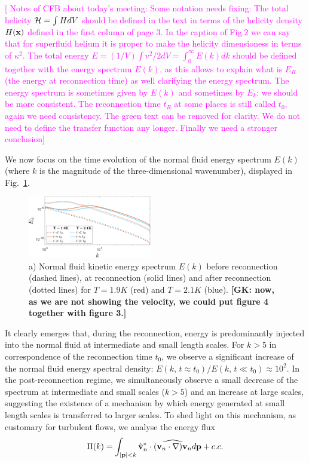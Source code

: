 \documentclass[%
 reprint,
 amsmath,amssymb,
 aps,
 prl,
]{revtex4-2}
\def \v{\mathbf{v}}
\def\magenta#1{\textcolor{magenta}{#1}}
\newcommand*{\NOTE}[1]{\textbf{\color{red}[#1]}}
\begin{document}
{\magenta{[
Notes of CFB about today's meeting:
Some notation needs fixing: The total helicity ${\cal H}=\int H dV$
 should be defined in the text
in terms of the helicity density $H({\bf x})$ defined in the first
column of page 3. In the caption of Fig.2 we can say that for superfluid
helium it is proper to make the helicity dimensioness in terms of $\kappa^2$.
The total energy 
$E=(1/V) \int v^2/2 dV=\int_0^{\infty} E(k) dk$ should be defined together
with the energy spectrum $E(k)$, as this allows to explain what is $E_R$
(the energy at reconnection time) as well clarifying the energy spectrum.
The energy spectrum is sometimes given by $E(k)$ and sometimes by $E_k$: we
should be more consistent. The reconnection time $t_R$ at some places is still
called $t_0$, again we need consistency. The green text can
be removed for clarity. We do not need to define the transfer function
any longer. Finally we need a stronger conclusion]}

We now focus on the time evolution of the normal fluid energy spectrum $E(k)$ (where $k$ is the magnitude of the three-dimensional wavenumber), displayed in Fig.~\ref{fig:kinetic-energy}.
\begin{figure}[h!]
    \centering
    \includegraphics*[width=0.48\textwidth]{energy-spec.pdf}
    \caption{a) Normal fluid kinetic energy spectrum $E(k)$ before 
reconnection (dashed lines), at reconnection (solid lines) 
and after reconnection (dotted lines) for $T=1.9K$ (red)
and $T=2.1K$ (blue). 
 \NOTE{GK: now, as we are not showing the velocity, we could put figure 4 together with figure 3.}}
    \label{fig:kinetic-energy}
\end{figure}
%
%
It clearly emerges that, during the reconnection, energy is predominantly injected into the normal fluid at intermediate and small length scales. 
For $k>5$ in correspondence of the reconnection time $t_0$,
we observe a significant increase of the normal fluid energy spectral density:
$E(k,\, t\approx t_0)/E(k,\, t\ll t_0) \approx 10^2$. 
%
In the post-reconnection regime, we simultaneously observe a small 
decrease of the spectrum at intermediate 
and small scales ($k > 5$) and an increase at large scales, 
suggesting the existence of a mechanism by 
which energy generated at small length scales is transferred to larger scales. 
To shed light on this mechanism, as customary for turbulent flows, we analyse the energy flux 
\begin{equation}
    \Pi(k)=\int_{|{\bf p}|<k}  \hat{\mathbf{v}}_n^*\cdot \widehat{(\v_n\cdot\nabla)\v_n}d {\bf p} +c.c.
\end{equation}


}
\end{document}
